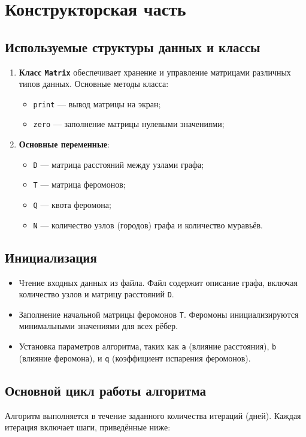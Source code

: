 \chapter{Конструкторская часть}
\section{Используемые структуры данных и классы}
\begin{enumerate}
	\item \textbf{Класс \texttt{Matrix}} обеспечивает хранение и управление матрицами различных типов данных. Основные методы класса:
	\begin{itemize}
		\item \texttt{print} --- вывод матрицы на экран;
		\item \texttt{zero} --- заполнение матрицы нулевыми значениями;
	\end{itemize}
	\item \textbf{Основные переменные}:
	\begin{itemize}
		\item \texttt{D} --- матрица расстояний между узлами графа;
		\item \texttt{T} --- матрица феромонов;
		\item \texttt{Q} --- квота феромона;
		\item \texttt{N} --- количество узлов (городов) графа и количество муравьёв.
	\end{itemize}
\end{enumerate}

\section{Инициализация}
\begin{itemize}
	\item Чтение входных данных из файла. Файл содержит описание графа, включая количество узлов и матрицу расстояний \texttt{D}.
	\item Заполнение начальной матрицы феромонов \texttt{T}. Феромоны инициализируются минимальными значениями для всех рёбер.
	\item Установка параметров алгоритма, таких как \texttt{a} (влияние расстояния), \texttt{b} (влияние феромона), и \texttt{q} (коэффициент испарения феромонов).
\end{itemize}

\section{Основной цикл работы алгоритма}
Алгоритм выполняется в течение заданного количества итераций (дней). Каждая итерация включает шаги, приведённые ниже:

